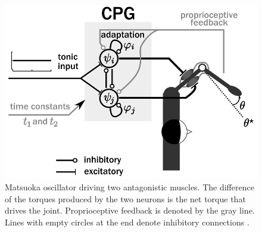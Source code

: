 \documentclass[12pt,twoside]{article}
\theoremstyle{plain}
\theoremstyle{definition}
\theoremstyle{remark}
\begin{document}
\begin{figure}[hbtp]
  \begin{minipage}[c]{0.45\textwidth}
    \includegraphics[width=\textwidth]{figures/matsuoka_diagram.png}
  \end{minipage}\hfill
  \begin{minipage}[c]{0.4\textwidth}
    \caption{Matsuoka oscillator driving two antagonistic muscles. The difference of the torques produced by the two neurons is the net torque that drives the joint. Proprioceptive feedback is denoted by the gray line. Lines with empty circles at the end denote inhibitory connections \cite{Ronsse2009}.
        } \label{fig:matsuoka_diagram}
  \end{minipage}
\end{figure}
\end{document}
